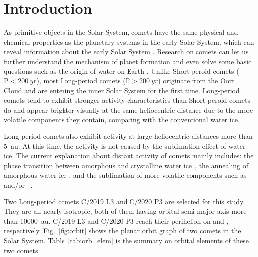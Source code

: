 \section{Introduction}

As primitive objects in the Solar System, comets have the same physical and chemical properties as the planetary systems in the early Solar System, which can reveal information about the early Solar System \citep{solontoi_ensemble_2012}. Research on comets can let us further understand the mechanism of planet formation and even solve some basic questions such as the origin of water on Earth \citep{alexander_water_2018}. Unlike Short-peroid comets ($\mathrm{P}<\qty{200}{yr}$), most Long-period comets ($\mathrm{P}>\qty{200}{yr}$) originate from the Oort Cloud and are entering the inner Solar System for the first time. Long-period comets tend to exhibit stronger activity characteristics than Short-peroid comets do and appear brighter visually at the same heliocentric distance due to the more volatile components they contain, comparing with the conventional water ice. 

Long-period comets also exhibit activity at large heliocentric distances more than {\qty{5}{\astronomicalunit}}. At this time, the activity is not caused by the sublimation effect of water ice. The current explanation about distant activity of comets mainly includes: the phase transition between amorphous and crystalline water ice~\citep{prialnik_crystallization_1992, capria_c1995_2002}, the annealing of amorphous water ice \citep{meech_activity_2009}, and the sublimation of more volatile components such as ~\citep{ootsubo_akari_2012} and/or ~\citep{jewitt_distant_2019}. 

Two Long-period comets C/2019 L3 and C/2020 P3 are selected for this study. They are all nearly isotropic, both of them having orbital semi-major axis more than {\qty{10000}{\astronomicalunit}}. C/2019 L3 and C/2020 P3 reach their perihelion on  and , respectively. Fig.~\ref{fig:orbit} shows the planar orbit graph of two comets in the Solar System. Table~\ref{tab:orb_elem} is the summary on orbital elements of these two comets. 

